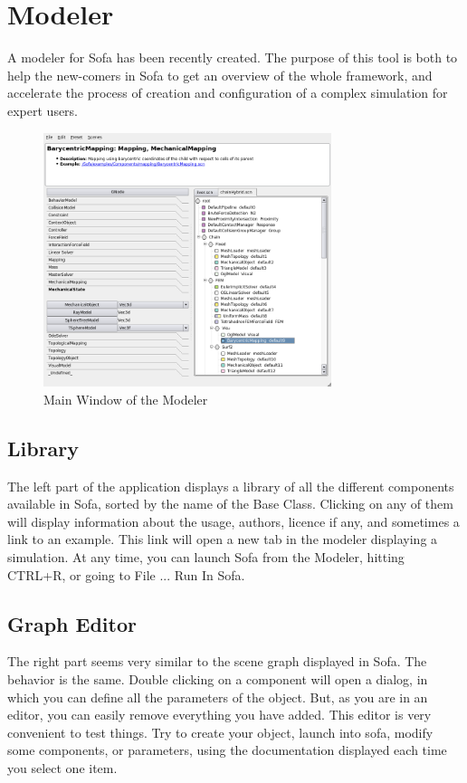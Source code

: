 \section{Modeler}
A modeler for Sofa has been recently created. The purpose of this tool is both to help the new-comers in Sofa to get an overview of the whole framework, and accelerate the process of creation and configuration of a complex simulation for expert users.
\begin{figure}[htpb]
	\centering
		\includegraphics[width=0.75\textwidth]{GUI/Modeler.png}
	\caption{Main Window of the Modeler} 	
\end{figure}

\subsection{Library}
The left part of the application displays a library of all the different components available in Sofa, sorted by the name of the Base Class. Clicking on any of them will display information about the usage, authors, licence if any, and sometimes a link to an example. This link will open a new tab in the modeler displaying a simulation. 
At any time, you can launch Sofa from the Modeler, hitting CTRL+R, or going to File ... Run In Sofa.
\subsection{Graph Editor}
The right part seems very similar to the scene graph displayed in Sofa. The behavior is the same. Double clicking on a component will open a dialog, in which you can define all the parameters of the object. But, as you are in an editor, you can easily remove everything you have added. This editor is very convenient to test things. Try to create your object, launch into sofa, modify some components, or parameters, using the documentation displayed each time you select one item. 
